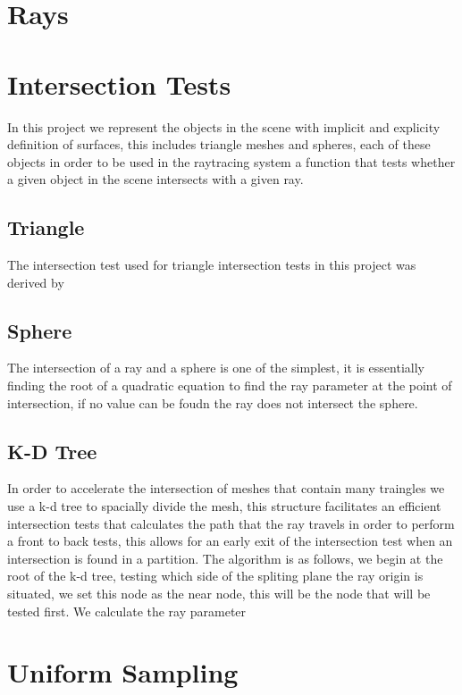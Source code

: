 \section{Rays}

\section{Intersection Tests}
In this project we represent the objects in the scene with implicit and explicity definition of surfaces, this includes
triangle meshes and spheres, each of these objects in order to be used in the raytracing system a function that tests
whether a given object in the scene intersects with a given ray.
\subsection{Triangle}
The intersection test used for triangle intersection tests in this project was derived by 
\subsection{Sphere}
The intersection of a ray and a sphere is one of the simplest, it is essentially finding the root of a quadratic equation to
find the ray parameter at the point of intersection, if no value can be foudn the ray does not intersect the sphere.
\subsection{K-D Tree}
In order to accelerate the intersection of meshes that contain many traingles we use a k-d tree to spacially divide the mesh,
this structure facilitates an efficient intersection tests that calculates the path that the ray travels in order to perform
a front to back tests, this allows for an early exit of the intersection test when an intersection is found in a partition.
The algorithm is as follows, we begin at the root of the k-d tree, testing which side of the spliting plane the ray origin
is situated, we set this node as the near node, this will be the node that will be tested first. We calculate the ray parameter


\section{Uniform Sampling}
